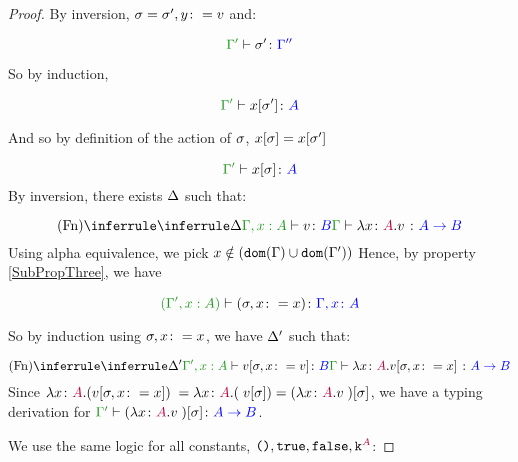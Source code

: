 \documentclass{report}
\begin{document}
\begin{framed}
\begin{proof}
            
                By inversion, $\sigma = \sigma', y\colon= v$
                and:
        
                \begin{equation}
                    \typerelation{\G'}{\si'}{\G''}
                \end{equation}
        
                So by induction,
        
                \begin{equation}
                    \typerelation{\G'}{x\sub{\si'}}{A}
                \end{equation}
        
                And so by definition of the action of $\sigma$, $x[\sigma] = x[\sigma']$
        
                \begin{equation}
                    \typerelation{\G'}{x\sub{\si}}{A}
                \end{equation}
        \case{\vfun}
            By inversion, there exists $\Delta$ such that:
        
            \begin{equation}
                \ntreeruleI{\vfun}{
                    \treeruleI{\D}{\typerelation{\G, x:A }{v}{B}}
                }{\typerelation{\G}{\lam{x}{A}{v}}{\ab}}
            \end{equation}
            Using alpha equivalence, we pick $x\notin(\texttt{dom}(\Gamma)\cup\texttt{dom}(\Gamma'))$
            Hence, by property \ref{SubPropThree}, we have
        
            \begin{equation}
                \typerelation{(\G', x:A )}{(\si, x\setto x)}{\gax}
            \end{equation}
        
            So by induction using $\sigma, x\colon= x$, we have $\Delta'$ such that:
        
            \begin{equation}
                \ntreeruleI{\vfun}{
                    \treeruleI{\D'}{\typerelation{\G', x:A }{v\sub{\si, x\setto v}}{B}}
                }{\typerelation{\G}{\lam{x}{A}{v\sub{\si, x\setto{x}}}}{\ab}}
            \end{equation} 
            Since $\lambda x \colon {\color{purple}A}. (v[\sigma, x\colon={x}])\; = {\lambda x \colon {\color{purple}A}. (\;{v[\sigma]})} = (\lambda x \colon {\color{purple}A}. v\;)[\sigma]$, we have a typing derivation for $\typerelation{\G'}{(\lam{x}{A}{v})\ssi}{\ab}$.
        
        \case{\vconst}
            We use the same logic for all constants, $\texttt{()},\texttt{true},\texttt{false},\texttt{k}^{\color{purple} A}$:
        

\end{proof}
\end{framed}
\end{document}
